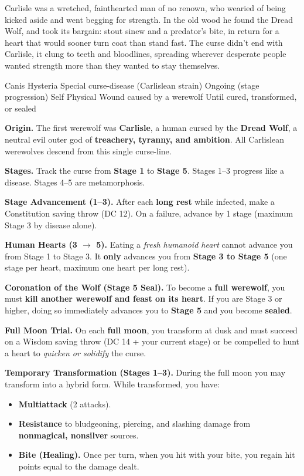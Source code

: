 \documentclass{apotheosis-book}
\begin{document}
Carlisle was a wretched, fainthearted man of no renown, who wearied of being kicked aside and went begging for strength. In the old wood he found the Dread Wolf, and took its bargain: stout sinew and a predator’s bite, in return for a heart that would sooner turn coat than stand fast. The curse didn’t end with Carlisle, it clung to teeth and bloodlines, spreading wherever desperate people wanted strength more than they wanted to stay themselves.

\DndSpellHeader%
  {Canis Hysteria}
  {Special curse-disease (Carlislean strain)}
  {Ongoing (stage progression)}
  {Self}
  {Physical Wound caused by a werewolf}
  {Until cured, transformed, or sealed}

\textbf{Origin.} The first werewolf was \textbf{Carlisle}, a human cursed by the \textbf{Dread Wolf}, a neutral evil outer god of \textbf{treachery, tyranny, and ambition}. All Carlislean werewolves descend from this single curse-line.

\textbf{Stages.} Track the curse from \textbf{Stage 1} to \textbf{Stage 5}. Stages 1--3 progress like a disease. Stages 4--5 are metamorphosis.

\textbf{Stage Advancement (1--3).} After each \textbf{long rest} while infected, make a Constitution saving throw (DC 12). On a failure, advance by 1 stage (maximum Stage 3 by disease alone).

\textbf{Human Hearts (3 $\rightarrow$ 5).} Eating a \emph{fresh humanoid heart} cannot advance you from Stage 1 to Stage 3. It \textbf{only} advances you from \textbf{Stage 3 to Stage 5} (one stage per heart, maximum one heart per long rest).

\textbf{Coronation of the Wolf (Stage 5 Seal).} To become a \textbf{full werewolf}, you must \textbf{kill another werewolf and feast on its heart}. If you are Stage 3 or higher, doing so immediately advances you to \textbf{Stage 5} and you become \textbf{sealed}.

\textbf{Full Moon Trial.} On each \textbf{full moon}, you transform at dusk and must succeed on a Wisdom saving throw (DC 14 + your current stage) or be compelled to hunt a heart to \emph{quicken or solidify} the curse. 

\textbf{Temporary Transformation (Stages 1--3).} During the full moon you may transform into a hybrid form. While transformed, you have:
\begin{itemize}
\item \textbf{Multiattack} (2 attacks).
\item \textbf{Resistance} to bludgeoning, piercing, and slashing damage from \textbf{nonmagical, nonsilver} sources.
\item \textbf{Bite (Healing).} Once per turn, when you hit with your bite, you regain hit points equal to the damage dealt.
\end{itemize}
\end{document}
